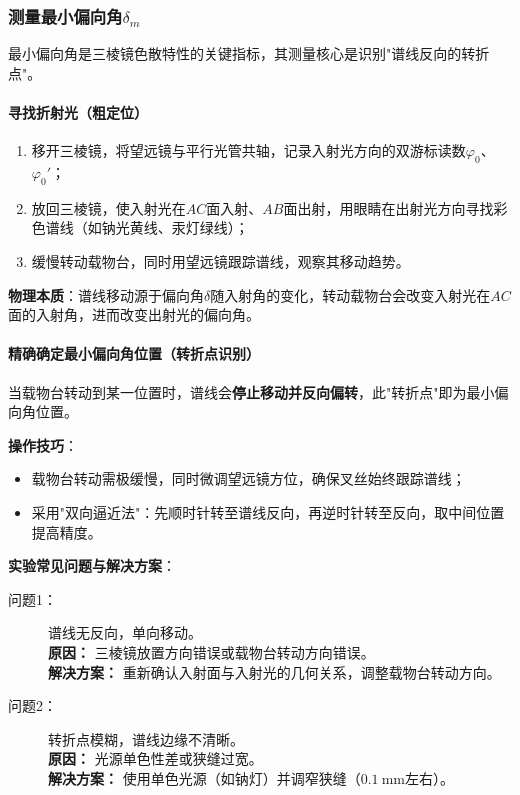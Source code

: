 \documentclass[11pt]{article}
\begin{document}
\subsubsection{测量最小偏向角\(\delta_m\)}
最小偏向角是三棱镜色散特性的关键指标，其测量核心是识别"谱线反向的转折点"。

\paragraph{寻找折射光（粗定位）}
\begin{enumerate}[label=(\arabic*), itemsep=0.5ex]
    \item 移开三棱镜，将望远镜与平行光管共轴，记录入射光方向的双游标读数\(\varphi_0\)、\(\varphi_0'\)；
    \item 放回三棱镜，使入射光在\(AC\)面入射、\(AB\)面出射，用眼睛在出射光方向寻找彩色谱线（如钠光黄线、汞灯绿线）；
    \item 缓慢转动载物台，同时用望远镜跟踪谱线，观察其移动趋势。
\end{enumerate}

\textbf{物理本质}：谱线移动源于偏向角\(\delta\)随入射角的变化，转动载物台会改变入射光在\(AC\)面的入射角，进而改变出射光的偏向角。

\paragraph{精确确定最小偏向角位置（转折点识别）}
当载物台转动到某一位置时，谱线会\textbf{停止移动并反向偏转}，此"转折点"即为最小偏向角位置。

\textbf{操作技巧}：
\begin{itemize}
    \item 载物台转动需极缓慢，同时微调望远镜方位，确保叉丝始终跟踪谱线；
    \item 采用"双向逼近法"：先顺时针转至谱线反向，再逆时针转至反向，取中间位置提高精度。
\end{itemize}

\textbf{实验常见问题与解决方案}：
\begin{description}
    \item[问题1：] 谱线无反向，单向移动。\\
    \textbf{原因：} 三棱镜放置方向错误或载物台转动方向错误。\\
    \textbf{解决方案：} 重新确认入射面与入射光的几何关系，调整载物台转动方向。
    
    \item[问题2：] 转折点模糊，谱线边缘不清晰。\\
    \textbf{原因：} 光源单色性差或狭缝过宽。\\
    \textbf{解决方案：} 使用单色光源（如钠灯）并调窄狭缝（\(0.1\ \text{mm}\)左右）。
\end{description}
\end{document}
